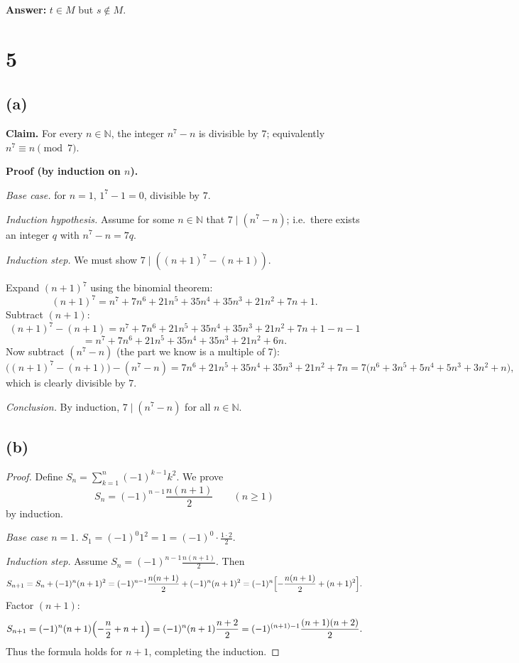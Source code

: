 \documentclass[12pt,a4paper]{article}
\theoremstyle{definition}
\theoremstyle{remark}
\begin{document}
\textbf{Answer:} $t \in M$ but $s \notin M$.



\section*{5}

\subsection*{(a)}

\textbf{Claim.} For every \(n \in \mathbb{N}\), the integer \(n^{7}-n\) is divisible by \(7\); equivalently \(n^{7} \equiv n \pmod 7\).

\textbf{Proof (by induction on \(n\)).}

\emph{Base case.}  
for \(n=1\), \(1^{7}-1=0\), divisible by \(7\).  

\emph{Induction hypothesis.}  
Assume for some \(n \in \mathbb{N}\) that \(7 \mid (n^{7}-n)\); i.e.\ there exists an integer \(q\) with \(n^{7}-n = 7q\).

\emph{Induction step.}  
We must show \(7 \mid ((n+1)^{7} - (n+1))\).

Expand \((n+1)^{7}\) using the binomial theorem:
\[
(n+1)^{7} = n^{7} + 7n^{6} + 21n^{5} + 35n^{4} + 35n^{3} + 21n^{2} + 7n + 1.
\]
Subtract \((n+1)\):
\[
(n+1)^{7} - (n+1)
= n^{7} + 7n^{6} + 21n^{5} + 35n^{4} + 35n^{3} + 21n^{2} + 7n + 1 - n - 1 \]
\[
= n^{7} + 7n^{6} + 21n^{5} + 35n^{4} + 35n^{3} + 21n^{2} + 6n.
\]
Now subtract \((n^{7}-n)\) (the part we know is a multiple of 7):
\[
\bigl((n+1)^{7} - (n+1)\bigr) - (n^{7}-n)
= 7n^{6} + 21n^{5} + 35n^{4} + 35n^{3} + 21n^{2} + 7n
= 7\bigl(n^{6} + 3n^{5} + 5n^{4} + 5n^{3} + 3n^{2} + n\bigr),
\]
which is clearly divisible by \(7\).

\emph{Conclusion.} By induction, \(7 \mid (n^{7}-n)\) for all \(n \in \mathbb{N}\).



\subsection*{(b)}
\begin{proof}
Define \(S_n = \sum_{k=1}^n (-1)^{k-1} k^{2}\). We prove
\[
S_n = (-1)^{n-1}\frac{n(n+1)}{2}\qquad (n\ge 1)
\]
by induction.

\emph{Base case \(n=1\).} \(S_1 = (-1)^0 1^2 = 1 = (-1)^0 \cdot \frac{1\cdot 2}{2}\).

\emph{Induction step.} Assume \(S_n = (-1)^{n-1} \frac{n(n+1)}{2}\). Then
\[
S_{n+1} = S_n + (-1)^n (n+1)^2
= (-1)^{n-1} \frac{n(n+1)}{2} + (-1)^n (n+1)^2
= (-1)^n\Bigl[-\frac{n(n+1)}{2} + (n+1)^2\Bigr].
\]
Factor \((n+1)\):
\[
S_{n+1} = (-1)^n (n+1)\Bigl(-\frac{n}{2} + n + 1\Bigr)
= (-1)^n (n+1)\frac{n+2}{2}
= (-1)^{(n+1)-1} \frac{(n+1)(n+2)}{2}.
\]
Thus the formula holds for \(n+1\), completing the induction.
\end{proof}
\end{document}
